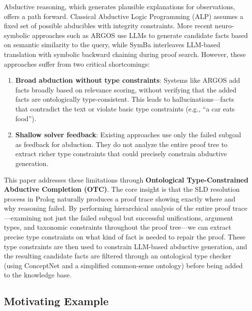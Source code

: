 \documentclass[11pt,letterpaper]{article}
\begin{document}
Abductive reasoning, which generates plausible explanations for observations, offers a path forward. Classical Abductive Logic Programming (ALP) \cite{Kakas1993, Inoue1991} assumes a fixed set of possible abducibles with integrity constraints. More recent neuro-symbolic approaches such as ARGOS \cite{Cotnareanu2025} use LLMs to generate candidate facts based on semantic similarity to the query, while SymBa \cite{Lee2024} interleaves LLM-based translation with symbolic backward chaining during proof search. However, these approaches suffer from two critical shortcomings:

\begin{enumerate}
  \item \textbf{Broad abduction without type constraints}: Systems like ARGOS add facts broadly based on relevance scoring, without verifying that the added facts are ontologically type-consistent. This leads to hallucinations---facts that contradict the text or violate basic type constraints (e.g., ``a car eats food'').

  \item \textbf{Shallow solver feedback}: Existing approaches use only the failed subgoal as feedback for abduction. They do not analyze the entire proof tree to extract richer type constraints that could precisely constrain abductive generation.
\end{enumerate}

This paper addresses these limitations through \textbf{Ontological Type-Constrained Abductive Completion (OTC)}. The core insight is that the SLD resolution process in Prolog naturally produces a proof trace showing exactly where and why reasoning failed. By performing hierarchical analysis of the entire proof trace---examining not just the failed subgoal but successful unifications, argument types, and taxonomic constraints throughout the proof tree---we can extract precise type constraints on what kind of fact is needed to repair the proof. These type constraints are then used to constrain LLM-based abductive generation, and the resulting candidate facts are filtered through an ontological type checker (using ConceptNet and a simplified common-sense ontology) before being added to the knowledge base.

\subsection{Motivating Example}
\end{document}
